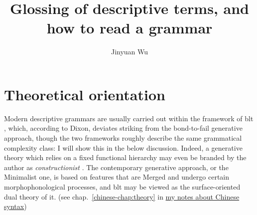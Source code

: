 \documentclass{article}
\title{Glossing of descriptive terms, and how to read a grammar}
\author{Jinyuan Wu}
\newcommand*{\citechap}[1]{chap.~{#1}}
\newcommand{\chinese}{\href{../Chinese/main.pdf}{my notes about Chinese syntax}}
\begin{document}
\maketitle

\section{Theoretical orientation}\label{sec:theory}

Modern descriptive grammars are usually carried out within the framework of \ac{blt} 
\citep{dixon2009basic1,dixon2010basic2,dixon2012basic3},
which, according to Dixon, deviates striking from the bond-to-fail generative approach,
though the two frameworks roughly describe the same grammatical complexity class:
I will show this in the below discussion.
Indeed, a generative theory which relies on a fixed functional hierarchy 
may even be branded by the author as \emph{constructionist} \citep{chen2016mandarin}.
The contemporary generative approach, or the Minimalist one, 
is based on features that are Merged and undergo certain morphophonological processes,
and \ac{blt} may be viewed as the surface-oriented dual theory of it.
(see \citechap{\ref{chinese-chap:theory}} in \chinese)
\end{document}
